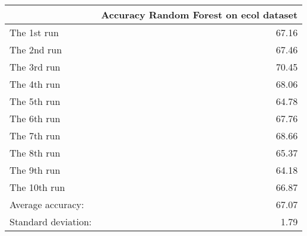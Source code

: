 \begin{tabular}{lr}
\toprule
{} &  Accuracy Random Forest on ecol dataset \\
\midrule
The 1st run         &                                   67.16 \\
The 2nd run         &                                   67.46 \\
The 3rd run         &                                   70.45 \\
The 4th run         &                                   68.06 \\
The 5th run         &                                   64.78 \\
The 6th run         &                                   67.76 \\
The 7th run         &                                   68.66 \\
The 8th run         &                                   65.37 \\
The 9th run         &                                   64.18 \\
The 10th run        &                                   66.87 \\
Average accuracy:   &                                   67.07 \\
Standard deviation: &                                    1.79 \\
\bottomrule
\end{tabular}
